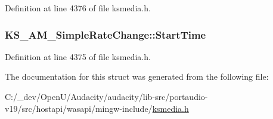 Definition at line 4376 of file ksmedia.\+h.

\subsubsection[{\texorpdfstring{Start\+Time}{StartTime}}]{ K\+S\+\_\+\+A\+M\+\_\+\+Simple\+Rate\+Change\+::\+Start\+Time}\hypertarget{struct_k_s___a_m___simple_rate_change_aebe6a3cab584b867b69f0830fccd4604}{}\label{struct_k_s___a_m___simple_rate_change_aebe6a3cab584b867b69f0830fccd4604}


Definition at line 4375 of file ksmedia.\+h.



The documentation for this struct was generated from the following file\+:\begin{DoxyCompactItemize}
\item 
C\+:/\+\_\+dev/\+Open\+U/\+Audacity/audacity/lib-\/src/portaudio-\/v19/src/hostapi/wasapi/mingw-\/include/\hyperlink{ksmedia_8h}{ksmedia.\+h}\end{DoxyCompactItemize}

